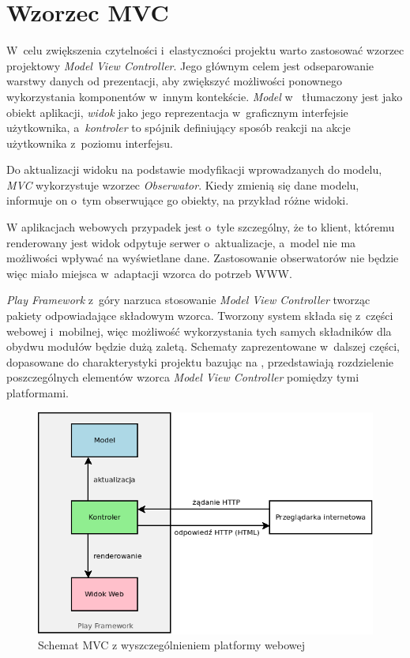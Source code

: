 \documentclass[11pt]{aghdpl}
\begin{document}
\section{Wzorzec MVC}
\label{sec:wzorzecMVC}

W~celu zwiększenia czytelności i~elastyczności projektu warto zastosować wzorzec projektowy \emph{Model View Controller}. Jego głównym celem jest odseparowanie warstwy danych od prezentacji, aby zwiększyć możliwości ponownego wykorzystania komponentów w~innym kontekście. \emph{Model} w~\cite{GoF} tłumaczony jest jako obiekt aplikacji, \emph{widok} jako jego reprezentacja w~graficznym interfejsie użytkownika, a~\emph{kontroler} to spójnik definiujący sposób reakcji na akcje użytkownika z~poziomu interfejsu.

Do aktualizacji widoku na podstawie modyfikacji wprowadzanych do modelu, \emph{MVC} wykorzystuje wzorzec \emph{Obserwator}. Kiedy zmienią się dane modelu, informuje on o~tym obserwujące go obiekty, na przykład różne widoki.

W aplikacjach webowych przypadek jest o~tyle szczególny, że to klient, któremu renderowany jest widok odpytuje serwer o~aktualizacje, a~model nie ma możliwości wpływać na wyświetlane dane. Zastosowanie obserwatorów nie będzie więc miało miejsca w~adaptacji wzorca do potrzeb WWW.

\emph{Play Framework} z~góry narzuca stosowanie \emph{Model View Controller} tworząc pakiety odpowiadające składowym wzorca. Tworzony system składa się z~części webowej i~mobilnej, więc możliwość wykorzystania tych samych składników dla obydwu modułów będzie dużą zaletą. Schematy zaprezentowane w~dalszej części, dopasowane do charakterystyki projektu bazując na \cite{PfMC}, przedstawiają rozdzielenie poszczególnych elementów wzorca \emph{Model View Controller} pomiędzy tymi platformami.

\begin{figure}[h!]
	\centering
	\includegraphics[width=\linewidth * 4/5]{MVC-WEB}
	\caption{Schemat MVC z wyszczególnieniem platformy webowej}
	\label{fig:mvc-web}
\end{figure}
\end{document}
